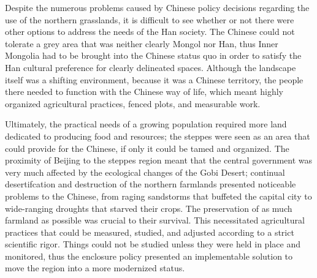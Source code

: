Despite the numerous problems caused by Chinese policy decisions
regarding the use of the northern grasslands, it is difficult to see whether or
not there were other options to address the needs of the Han society. The
Chinese could not tolerate a grey area that was neither clearly Mongol nor Han,
thus Inner Mongolia had to be brought into the Chinese status quo
in order to satisfy the Han cultural preference for clearly delineated spaces. Although
the landscape itself was a shifting environment, because it was a
Chinese territory, the people there needed to function with the Chinese
way of life, which meant highly organized agricultural practices, fenced plots, and measurable work.

Ultimately, the practical needs of a growing population required more
land dedicated to producing food and
resources; the steppes were seen as an area that could provide for the
Chinese, if only it could be tamed and organized. The proximity of
Beijing to the steppes region meant that the central government was very
much affected by the ecological changes of the Gobi Desert; continual
desertifcation and destruction of the northern farmlands presented
noticeable problems to the Chinese, from raging sandstorms that
buffeted the capital city to wide-ranging droughts that starved their
crops. The preservation of as much farmland as possible was crucial to
their survival. This necessitated agricultural
practices that could be measured, studied, and adjusted according to a
strict scientific rigor. Things could not be studied unless they were
held in place and monitored, thus the enclosure policy presented an
implementable solution to move the region into a more modernized status.

